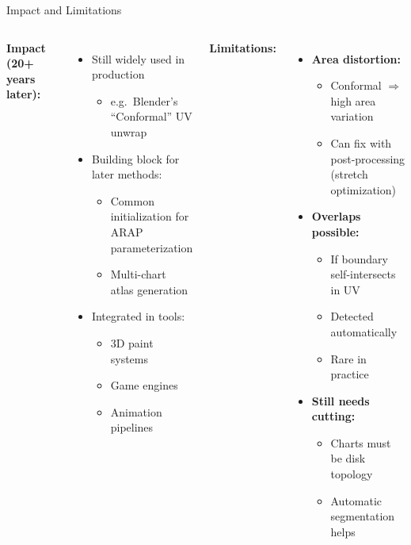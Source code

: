 \documentclass[aspectratio=169]{beamer}
\begin{document}
\begin{frame}{Impact and Limitations}

\begin{columns}[T]
\textbf{Impact (20+ years later):}
\begin{itemize}
  \item \alert{Still widely used} in production
  \begin{itemize}
    \item e.g.\ Blender's ``Conformal'' UV unwrap
  \end{itemize}
  \item Building block for later methods:
  \begin{itemize}
    \item Common initialization for ARAP parameterization
    \item Multi-chart atlas generation
  \end{itemize}
  \item Integrated in tools:
  \begin{itemize}
    \item 3D paint systems
    \item Game engines
    \item Animation pipelines
  \end{itemize}
\end{itemize}

\textbf{Limitations:}
\begin{itemize}
  \item \textbf{Area distortion:}
  \begin{itemize}
    \item Conformal $\Rightarrow$ high area variation
    \item Can fix with post-processing (stretch optimization)
  \end{itemize}

  \item \textbf{Overlaps possible:}
  \begin{itemize}
    \item If boundary self-intersects in UV
    \item Detected automatically
    \item Rare in practice
  \end{itemize}

  \item \textbf{Still needs cutting:}
  \begin{itemize}
    \item Charts must be disk topology
    \item Automatic segmentation helps
  \end{itemize}
\end{itemize}
\end{columns}

\end{frame}
\end{document}
